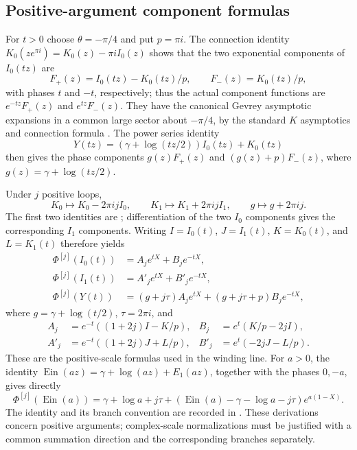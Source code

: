 \documentclass[11pt,a4paper]{article}
\theoremstyle{definition}\newtheorem{definition}[theorem]{Definition}
\theoremstyle{remark}\newtheorem{remark}[theorem]{Remark}
\newcommand{\Ein}{\operatorname{Ein}}
\begin{document}
\subsection{Positive-argument component formulas}
For $t>0$ choose $\theta=-\pi/4$ and put $p=\pi i$.
The connection identity
$K_0(ze^{\pi i})=K_0(z)-\pi iI_0(z)$ shows that the two exponential
components of $I_0(tz)$ are
\[
 F_+(z)=I_0(tz)-K_0(tz)/p,
 \qquad F_-(z)=K_0(tz)/p,
\]
with phases $t$ and $-t$, respectively; thus the actual component
functions are $e^{-tz}F_+(z)$ and $e^{tz}F_-(z)$.
They have the canonical Gevrey asymptotic expansions in a common large
sector about $-\pi/4$, by the standard $K$ asymptotics and connection
formula \cite[\S\S10.34, 10.40]{DLMF}.  The power series identity
\[
 Y(tz)=(\gamma+\log(tz/2))I_0(tz)+K_0(tz)
\]
then gives the phase components
$g(z)F_+(z)$ and $(g(z)+p)F_-(z)$, where
$g(z)=\gamma+\log(tz/2)$.

Under $j$ positive loops,
\[
 K_0\longmapsto K_0-2\pi ij I_0,\qquad
 K_1\longmapsto K_1+2\pi ij I_1,\qquad
 g\longmapsto g+2\pi ij.
\]
The first two identities are \cite[10.34.5]{DLMF}; differentiation of
the two $I_0$ components gives the corresponding $I_1$ components.
Writing $I=I_0(t)$, $J=I_1(t)$, $K=K_0(t)$, and $L=K_1(t)$ therefore yields
\begin{align*}
 \Phi^{[j]}(I_0(t))&=A_je^{tX}+B_je^{-tX},\\
 \Phi^{[j]}(I_1(t))&=A'_je^{tX}+B'_je^{-tX},\\
 \Phi^{[j]}(Y(t))&=(g+j\tau)A_je^{tX}
                    +(g+j\tau+p)B_je^{-tX},
\end{align*}
where $g=\gamma+\log(t/2)$, $\tau=2\pi i$, and
\begin{align*}
 A_j&=e^{-t}((1+2j)I-K/p),&B_j&=e^t(K/p-2jI),\\
 A'_j&=e^{-t}((1+2j)J+L/p),&B'_j&=e^t(-2jJ-L/p).
\end{align*}
These are the positive-scale formulas used in the winding line.
For $a>0$, the identity
$\Ein(az)=\gamma+\log(az)+E_1(az)$, together with the phases $0,-a$,
gives directly
\[
 \Phi^{[j]}(\Ein(a))=\gamma+\log a+j\tau+
 (\Ein(a)-\gamma-\log a-j\tau)e^{a(1-X)}.
\]
The identity and its branch convention are recorded in
\cite[6.2.4]{DLMF}.  These derivations concern positive arguments;
complex-scale normalizations must be justified with a common summation
direction and the corresponding branches separately.
\end{document}
